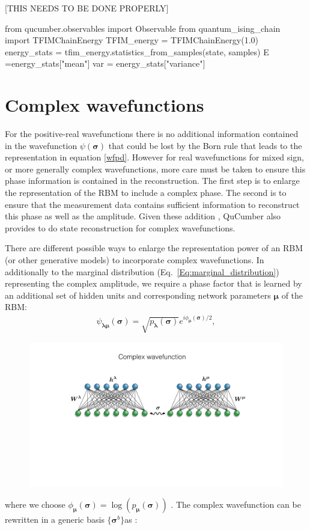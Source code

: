 \documentclass[submission, Phys]{SciPost}
\begin{document}
[THIS NEEDS TO BE DONE PROPERLY]
\begin{python}
from qucumber.observables import Observable
from quantum_ising_chain import TFIMChainEnergy
TFIM_energy = TFIMChainEnergy(1.0)
energy_stats = tfim_energy.statistics_from_samples(state, samples)
E =energy_stats["mean"]
var = energy_stats["variance"]
\end{python}



\section{Complex wavefunctions}
\label{Sec:Training_QuCumber_on_complex_wavefunctions}

For the positive-real wavefunctions there is no additional information contained in the wavefunction
$\psi( \boldsymbol{\sigma})$ that could be lost by the Born rule that leads to the representation in equation \ref{wfpd}.
However for real wavefunctions for mixed sign, or more generally complex wavefunctions, more care must be taken to ensure 
this phase information is contained in the reconstruction.  The first step is to enlarge the representation of the RBM to 
include a complex phase.  The second is to ensure that the measurement data contains sufficient information to reconstruct
this phase as well as the amplitude.
Given these addition , QuCumber also provides to do state reconstruction for complex wavefunctions.

There are different possible ways to enlarge the representation power of an RBM (or other generative models) to 
incorporate complex wavefunctions.  
In additionally to the marginal distribution (Eq.~\ref{Eq:marginal_distribution}) representing the complex amplitude,
we require a phase factor that is learned by an additional set of hidden units and corresponding network parameters $\bm{\mu}$ of the RBM:
\begin{align}
	\psi_{\bm{\lambda} \bm{\mu}} (\bm{\sigma})= \sqrt{p_{\bm{\lambda}} (\bm{\sigma})} e^{i \phi_{\bm{\mu}} (\bm{\sigma})/2},
\end{align}
%
\begin{figure}[htpb]
    \centering
    \includegraphics[width=1\linewidth]{plots/ch3_complexNW.pdf}
    \caption{}
    \label{fig:}
\end{figure}
where we choose $\phi_{\bm{\mu}}(\bm{\sigma}) = \log (p_{\bm{\mu}} (\bm{\sigma}))$ \cite{torlai2018tomography}. 
The complex wavefunction can be rewritten in a generic basis $\{ \bm{\sigma}^b \}$as :
\end{document}
